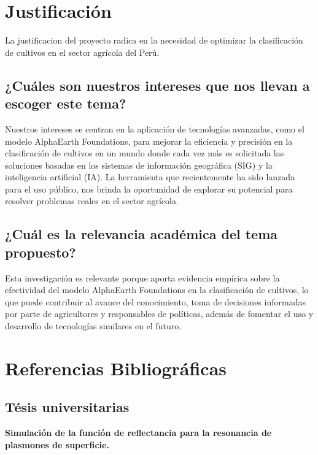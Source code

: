 \section{Justificación}

La justificacion del proyecto radica en la necesidad de optimizar la clasificación de cultivos en el sector agrícola del Perú.

\subsection{¿Cuáles son nuestros intereses que nos llevan a escoger este tema?}

Nuestros intereses se centran en la aplicación de tecnologías avanzadas, como el modelo AlphaEarth Foundations, para mejorar la eficiencia y precisión en la clasificación de cultivos en un mundo donde cada vez más es solicitada las soluciones basadas en los sistemas de información geográfica (SIG) y la inteligencia artificial (IA). La herramienta que recientemente ha sido lanzada para el uso público, nos brinda la oportunidad de explorar su potencial para resolver problemas reales en el sector agrícola.

\subsection{¿Cuál es la relevancia académica del tema propuesto?}

Esta investigación es relevante porque aporta evidencia empírica sobre la efectividad del modelo AlphaEarth Foundations en la clasificación de cultivos, lo que puede contribuir al avance del conocimiento, toma de decisiones informadas por parte de agricultores y responsables de políticas, además de fomentar el uso y desarrollo de tecnologías similares en el futuro.

\section{Referencias Bibliográficas}

\subsection{Tésis universitarias}

\textbf{Simulación de la función de reflectancia para la resonancia de plasmones de superficie. \cite{Superficie2024}}


